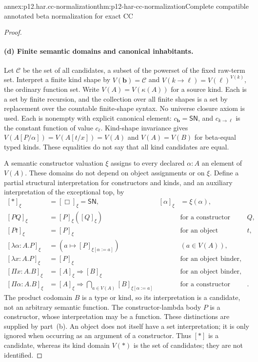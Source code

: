 \begin{annexitem}{annex:p12.har.cc-normalization}{thm:p12-har-cc-normalization}{Complete compatible annotated beta normalization for exact CC}
\begin{proof}
\paragraph{(d) Finite semantic domains and canonical inhabitants.}
Let \(\mathcal C\) be the set of all candidates, a subset of the
powerset of the fixed raw-term set. Interpret a finite kind shape by
\(V(\mathbf b)=\mathcal C\) and
\(V(k\to\ell)=V(\ell)^{V(k)}\), the ordinary function set.
Write \(V(A)=V(\kappa(A))\) for a source kind. Each is a set by
finite recursion, and the collection over all finite shapes is a set
by replacement over the countable finite-shape syntax. No universe
closure axiom is used. Each is nonempty with explicit canonical element:
\(c_{\mathbf b}=\mathsf{SN}\), and
\(c_{k\to\ell}\) is the constant function of value \(c_\ell\).
Kind-shape invariance gives \(V(A[P/\alpha])=V(A[t/x])=V(A)\)
and \(V(A)=V(B)\) for beta-equal typed kinds. These equalities do not
say that all kind candidates are equal.

A semantic constructor valuation \(\xi\) assigns to every declared
\(\alpha:A\) an element of \(V(A)\). These domains do not depend
on object assignments or on \(\xi\). Define a partial structural
interpretation for constructors and kinds, and an auxiliary interpretation
of the exceptional top, by
\[
\begin{aligned}
 [\ast]_\xi&=[\Box]_\xi=\mathsf{SN},&
 [\alpha]_\xi&=\xi(\alpha),\\
 [PQ]_\xi&=[P]_\xi([Q]_\xi)&&\text{for a constructor argument }Q,\\
 [Pt]_\xi&=[P]_\xi&&\text{for an object argument }t,\\
 [\lambda\alpha:A.P]_\xi&=(a\mapsto[P]_{\xi[\alpha:=a]})
      &&(a\in V(A)),\\
 [\lambda x:A.P]_\xi&=[P]_\xi&&\text{for an object binder},\\
 [\Pi x:A.B]_\xi&=[A]_\xi\Rightarrow[B]_\xi
      &&\text{for an object binder},\\
 [\Pi\alpha:A.B]_\xi&=[A]_\xi\Rightarrow
           \bigcap_{a\in V(A)}[B]_{\xi[\alpha:=a]}
      &&\text{for a constructor binder}.
\end{aligned}
\]
The product codomain \(B\) is a type or kind, so its interpretation is
a candidate, not an arbitrary semantic function. The constructor-lambda
body \(P\) is a constructor, whose interpretation may be a function.
These distinctions are supplied by part~(b). An object does not itself have
a set interpretation; it is only ignored when occurring as an argument
of a constructor. Thus \([\ast]\) is a candidate, whereas its kind
domain \(V(\ast)\) is the set of candidates; they are not identified.


\end{proof}
\end{annexitem}
